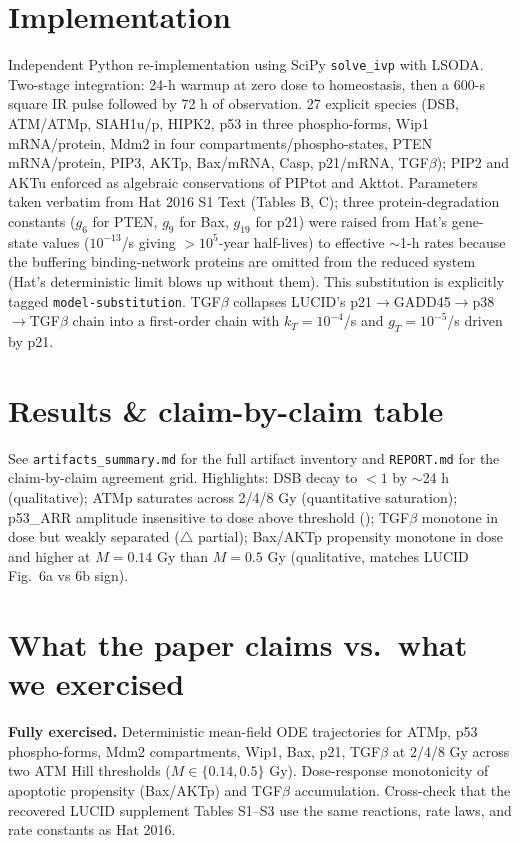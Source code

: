 \documentclass[11pt]{article}
\begin{document}
\section{Implementation}
Independent Python re-implementation using SciPy \texttt{solve\_ivp} with
LSODA. Two-stage integration: 24-h warmup at zero dose to homeostasis, then a
600-s square IR pulse followed by 72 h of observation. 27 explicit species
(DSB, ATM/ATMp, SIAH1u/p, HIPK2, p53 in three phospho-forms, Wip1 mRNA/protein,
Mdm2 in four compartments/phospho-states, PTEN mRNA/protein, PIP3, AKTp,
Bax/mRNA, Casp, p21/mRNA, TGF$\beta$); PIP2 and AKTu enforced as algebraic
conservations of PIPtot and Akttot. Parameters taken verbatim from Hat 2016
S1 Text (Tables B, C); three protein-degradation constants ($g_6$ for PTEN,
$g_9$ for Bax, $g_{19}$ for p21) were raised from Hat's gene-state values
($10^{-13}$/s giving $>10^5$-year half-lives) to effective $\sim$1-h rates
because the buffering binding-network proteins are omitted from the reduced
system (Hat's deterministic limit blows up without them). This substitution is
explicitly tagged \texttt{model-substitution}. TGF$\beta$ collapses LUCID's
p21$\to$GADD45$\to$p38$\to$TGF$\beta$ chain into a first-order chain with
$k_T = 10^{-4}$/s and $g_T = 10^{-5}$/s driven by p21.

\section{Results \& claim-by-claim table}
See \texttt{artifacts\_summary.md} for the full artifact inventory and
\texttt{REPORT.md} for the claim-by-claim agreement grid. Highlights:
DSB decay to $<1$ by $\sim$24 h (\checkmark qualitative); ATMp saturates
across 2/4/8 Gy (\checkmark quantitative saturation); p53\_ARR amplitude
insensitive to dose above threshold (\checkmark); TGF$\beta$ monotone in dose
but weakly separated ($\triangle$ partial); Bax/AKTp propensity monotone in
dose and higher at $M=0.14$ Gy than $M=0.5$ Gy (\checkmark qualitative,
matches LUCID Fig.\ 6a vs 6b sign).

\section{What the paper claims vs.\ what we exercised}

\textbf{Fully exercised.}
Deterministic mean-field ODE trajectories for ATMp, p53 phospho-forms,
Mdm2 compartments, Wip1, Bax, p21, TGF$\beta$ at 2/4/8 Gy across two ATM
Hill thresholds ($M \in \{0.14, 0.5\}$ Gy). Dose-response monotonicity of
apoptotic propensity (Bax/AKTp) and TGF$\beta$ accumulation. Cross-check
that the recovered LUCID supplement Tables S1--S3 use the same reactions,
rate laws, and rate constants as Hat 2016.
\end{document}
